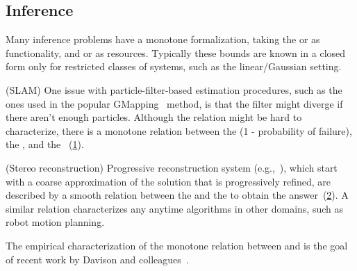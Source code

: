 \subsection{Inference}

Many inference problems have a monotone formalization, taking the
 or  as functionality, and 
or  as resources. Typically these bounds are known in
a closed form only for restricted classes of systems, such as the
linear/Gaussian setting.

\begin{example}
(SLAM)
    One issue with particle-filter-based estimation procedures,
    such as the ones used in the popular GMapping~\cite{grisetti07improved}
    method, is that the filter might diverge if there aren't enough particles.
    Although the relation might be hard to characterize, there is a monotone
    relation between the  (1 - probability of failure),
    the , and the ~(\cref{fig:gmapping}).
\end{example}

\begin{figure}[h]
    \centering
    \caption{\label{fig:gmapping} }
\end{figure}



\begin{example}
(Stereo reconstruction)
    Progressive reconstruction system (e.g.,~\cite{locher16progressive}),
    which start with a coarse approximation of the solution that is progressively
    refined, are described by a smooth relation between the 
    and the  to obtain the answer~(\cref{fig:progressive}).
    A similar relation characterizes any anytime algorithms in other domains,
    such as robot motion planning.
\end{example}


\begin{figure}[h]
    \centering
    \caption{\label{fig:progressive}}
\end{figure}


\begin{example}
    The empirical characterization of the monotone relation between  and 
    is the goal of recent work by Davison and colleagues~\cite{nardi15introducing,zia16comparative}.
\end{example}

